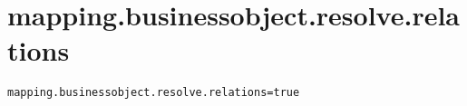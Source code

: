 \section{mapping.businessobject.resolve.relations}
\label{configuration:MappingBusinessobjectResolveRelations}
\AvailableInJavaOnly{\TODO}
\begin{lstlisting}[style=Props,caption={Usage example for \textit{mapping.businessobject.resolve.relations}}]
mapping.businessobject.resolve.relations=true
\end{lstlisting}
